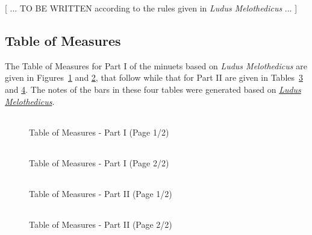 \documentclass[a4paper,x11names,svgnames,10pt]{article}
\begin{document}
{[ ... TO BE WRITTEN according to the rules given in {\em Ludus Melothedicus} ... ]


\subsection{Table of Measures}\label{tabMeas}

The Table of Measures for Part I of the minuets based on {\em Ludus Melothedicus} are given in Figures~\ref{fig:meas1} and  \ref{fig:meas2}, that follow while that for Part II are given in Tables~\ref{fig:meas3} and \ref{fig:meas4}.  The notes of the bars in these four tables were generated based on \href{https://imslp.org/wiki/Ludus_Melothedicus_(Anonymous)}{{\em Ludus Melothedicus}}.

${}_{}$\\
\vspace{0.10in}
\begin{figure}[H]
	\centering
	\def\svgwidth{0.975\columnwidth}
	
	\caption{Table of Measures - Part I (Page 1/2)}
	\label{fig:meas1}
\end{figure}

\newpage
${}_{}$\\
\vspace{0.10in}
\begin{figure}[H]
	\centering
	\def\svgwidth{0.975\columnwidth}
	
	\caption{Table of Measures - Part I (Page 2/2)}
	\label{fig:meas2}
\end{figure}

${}_{}$\\
\vspace{0.10in}
\begin{figure}[H]
	\centering
	\def\svgwidth{0.975\columnwidth}
	
	\caption{Table of Measures - Part II (Page 1/2)}
	\label{fig:meas3}
\end{figure}

\newpage
${}_{}$\\
\vspace{0.10in}
\begin{figure}[H]
	\centering
	\def\svgwidth{0.975\columnwidth}
	
	\caption{Table of Measures - Part II (Page 2/2)}
	\label{fig:meas4}
\end{figure}



}
\end{document}
